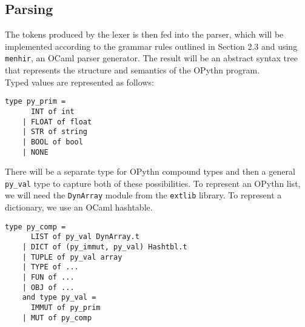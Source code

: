 \documentclass[11pt, twoside]{article}
\newcommand{\ms}{\texttt}
\begin{document}
    \subsection{Parsing}
    The tokens produced by the lexer is then fed into the parser, which will be implemented according to the grammar rules outlined in Section 2.3 and using \texttt{menhir}, an OCaml parser generator. The result will be an abstract syntax tree that represents the structure and semantics of the OPythn program.\\
     \indent Typed values are represented as follows:
    \begin{lstlisting}[language=caml]
    type py_prim =
      INT of int
    | FLOAT of float
    | STR of string
    | BOOL of bool
    | NONE
    \end{lstlisting}
    There will be a separate type for OPythn compound types and then a general \ms{py\_val} type to capture both of these possibilities. To represent an OPythn list, we will need the \ms{DynArray} module from the \ms{extlib} library. To represent a dictionary, we use an OCaml hashtable.
    \begin{lstlisting}[language=caml]
    type py_comp =
      LIST of py_val DynArray.t
    | DICT of (py_immut, py_val) Hashtbl.t
    | TUPLE of py_val array
    | TYPE of ...
    | FUN of ...
    | OBJ of ...
    and type py_val =
      IMMUT of py_prim
    | MUT of py_comp
    \end{lstlisting}
\end{document}

